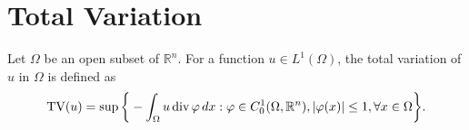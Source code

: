 \section{Total Variation} %
\label{sec:total_variation}
    
    \begin{definition} %
    \label{def:total_variation}

        Let $\Omega$ be an open subset of $\mathbb{R}^{n}$. For a function $u \in L^{1}(\Omega)$, the \textnormal{total variation} of $u$ in $\Omega$ is defined as
            \begin{equation}
                \textnormal{TV}(u) = \sup \bigg\{ -\int_{\Omega} u\, \textnormal{div}\, \varphi\, dx : \varphi \in C^{1}_{0}(\Omega, \mathbb{R}^{n}), |\varphi(x)| \le 1, \forall x \in \Omega \bigg\}.
                \label{eq:total_variation}
            \end{equation}

    \end{definition}

